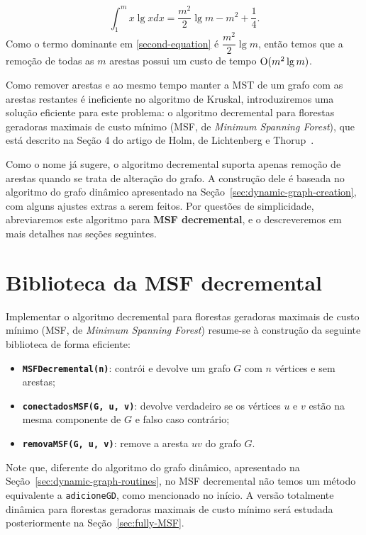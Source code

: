 \begin{equation}
    \int_{1}^{m} x \lg x dx = \dfrac{m^2}{2}\lg m - m^2 + \dfrac{1}{4}.
    \label{second-equation}
\end{equation}
Como o termo dominante em \ref{second-equation} é $\dfrac{m^2}{2}\lg m$, então temos que a remoção de todas as $m$ arestas possui um custo de tempo $\mathrm{O}(m^2 \lg m)$. 

Como remover arestas e ao mesmo tempo manter a MST de um grafo com as arestas restantes é ineficiente no algoritmo de Kruskal, introduziremos uma solução eficiente para este problema: o algoritmo decremental para florestas geradoras maximais de custo mínimo (MSF, de \textit{Minimum Spanning Forest}), que está descrito na Seção 4 do artigo de Holm, de Lichtenberg e Thorup~\cite{jacob_holm}.

Como o nome já sugere, o algoritmo decremental suporta apenas remoção de arestas quando se trata de alteração do grafo. A construção dele é baseada no algoritmo do grafo dinâmico apresentado na Seção~\ref{sec:dynamic-graph-creation}, com alguns ajustes extras a serem feitos. Por questões de simplicidade, abreviaremos este algoritmo para \textbf{MSF decremental}, e o descreveremos em mais detalhes nas seções seguintes.

\section{Biblioteca da MSF decremental}
\label{sec:decremental-msf-library}

Implementar o algoritmo decremental para florestas geradoras maximais de custo mínimo (MSF, de \textit{Minimum Spanning Forest}) resume-se à construção da seguinte biblioteca de forma eficiente:

\begin{itemize}
    \item \texttt{\textbf{MSFDecremental(n)}}: contrói e devolve um grafo $G$ com $n$ vértices e sem arestas;
    \item \texttt{\textbf{conectadosMSF(G, u, v)}}: devolve verdadeiro se os vértices $u$ e $v$ estão na mesma componente de $G$ e falso caso contrário;
    \item \texttt{\textbf{removaMSF(G, u, v)}}: remove a aresta $uv$ do grafo $G$.
\end{itemize} 

Note que, diferente do algoritmo do grafo dinâmico, apresentado na Seção~\ref{sec:dynamic-graph-routines}, no MSF decremental não temos um método equivalente a \texttt{adicioneGD}, como mencionado no início. A versão totalmente dinâmica para florestas geradoras maximais de custo mínimo será estudada posteriormente na Seção~\ref{sec:fully-MSF}.

